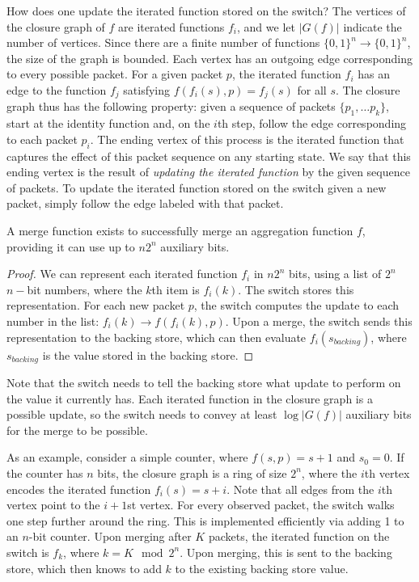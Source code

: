 How does one update the iterated function stored on the switch? The vertices of the closure graph of $f$ are iterated functions $f_i$, and we let $|G(f)|$ indicate the number of vertices. Since there are a finite number of functions $\{0, 1\}^n \rightarrow \{0, 1\}^n$, the size of the graph is bounded.
Each vertex has an outgoing edge corresponding to every possible packet. For a given packet $p$, the iterated function $f_i$ has an edge to the function $f_j$ satisfying $f(f_i(s), p) = f_j(s)$ for all $s$.
The closure graph thus has the following property: given a sequence of packets $\{p_1, \ldots p_k\}$, start at the identity function and, on the $i$th step, follow the edge corresponding to each packet $p_i$. The ending vertex of this process is the iterated function that captures the effect of this packet sequence on any starting state. We say that this ending vertex is the result of \emph{updating the iterated function} by the given sequence of packets. To update the iterated function stored on the switch given a new packet, simply follow the edge labeled with that packet.

\begin{theorem}
A merge function exists to successfully merge an aggregation function $f$, providing it can use up to $n2^n$ auxiliary bits.
\end{theorem}
\begin{proof}
We can represent each iterated function $f_i$ in $n2^n$ bits, using a list of $2^n$ $n-$bit numbers, where the $k$th item is $f_i(k)$. The switch stores this representation. For each new packet $p$, the switch computes the update to each number in the list: $f_i(k) \rightarrow f(f_i(k), p)$. Upon a merge, the switch sends this representation to the backing store, which can then evaluate $f_i(s_{backing})$, where $s_{backing}$ is the value stored in the backing store.
\end{proof}

Note that the switch needs to tell the backing store what update to perform on the value it currently has. Each iterated function in the closure graph is a possible update, so the switch needs to convey at least $\log |G(f)|$ auxiliary bits for the merge to be possible.

As an example, consider a simple counter, where $f(s, p) = s + 1$ and $s_0 = 0$. If the counter has $n$ bits, the closure graph is a ring of size $2^n$, where the $i$th vertex encodes the iterated function $f_i(s) = s + i$. Note that all edges from the $i$th vertex point to the $i+1$st vertex. For every observed packet, the switch walks one step further around the ring. This is implemented efficiently via adding 1 to an $n$-bit counter. Upon merging after $K$ packets, the iterated function on the switch is $f_{k}$, where $k = K \mod 2^n$. Upon merging, this is sent to the backing store, which then knows to add $k$ to the existing backing store value.

